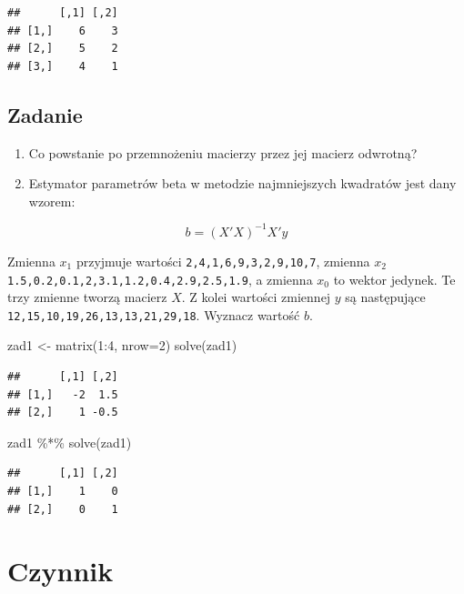 \documentclass[
]{book}
\newenvironment{Shaded}{\begin{snugshade}}{\end{snugshade}}
\newcommand{\AttributeTok}[1]{\textcolor[rgb]{0.77,0.63,0.00}{#1}}
\newcommand{\DecValTok}[1]{\textcolor[rgb]{0.00,0.00,0.81}{#1}}
\newcommand{\FunctionTok}[1]{\textcolor[rgb]{0.00,0.00,0.00}{#1}}
\newcommand{\NormalTok}[1]{#1}
\newcommand{\OtherTok}[1]{\textcolor[rgb]{0.56,0.35,0.01}{#1}}
\newcommand{\SpecialCharTok}[1]{\textcolor[rgb]{0.00,0.00,0.00}{#1}}
\providecommand{\tightlist}{%
  \setlength{\itemsep}{0pt}\setlength{\parskip}{0pt}}
\begin{document}
\begin{verbatim}
##      [,1] [,2]
## [1,]    6    3
## [2,]    5    2
## [3,]    4    1
\end{verbatim}

\hypertarget{zadanie}{%
\subsection{Zadanie}\label{zadanie}}

\begin{enumerate}
\def\labelenumi{\arabic{enumi}.}
\tightlist
\item
  Co powstanie po przemnożeniu macierzy przez jej macierz odwrotną?
\item
  Estymator parametrów beta w metodzie najmniejszych kwadratów jest dany wzorem:
\end{enumerate}

\[b=(X'X)^{-1}X'y\]

Zmienna \(x_1\) przyjmuje wartości \texttt{2,4,1,6,9,3,2,9,10,7}, zmienna \(x_2\) \texttt{1.5,0.2,0.1,2,3.1,1.2,0.4,2.9,2.5,1.9}, a zmienna \(x_0\) to wektor jedynek. Te trzy zmienne tworzą macierz \(X\). Z kolei wartości zmiennej \(y\) są następujące \texttt{12,15,10,19,26,13,13,21,29,18}. Wyznacz wartość \(b\).

\begin{Shaded}
\begin{Highlighting}[]
\NormalTok{zad1 }\OtherTok{\textless{}{-}} \FunctionTok{matrix}\NormalTok{(}\DecValTok{1}\SpecialCharTok{:}\DecValTok{4}\NormalTok{, }\AttributeTok{nrow=}\DecValTok{2}\NormalTok{)}
\FunctionTok{solve}\NormalTok{(zad1)}
\end{Highlighting}
\end{Shaded}

\begin{verbatim}
##      [,1] [,2]
## [1,]   -2  1.5
## [2,]    1 -0.5
\end{verbatim}

\begin{Shaded}
\begin{Highlighting}[]
\NormalTok{zad1 }\SpecialCharTok{\%*\%} \FunctionTok{solve}\NormalTok{(zad1)}
\end{Highlighting}
\end{Shaded}

\begin{verbatim}
##      [,1] [,2]
## [1,]    1    0
## [2,]    0    1
\end{verbatim}

\hypertarget{czynnik}{%
\section{Czynnik}\label{czynnik}}
\end{document}

